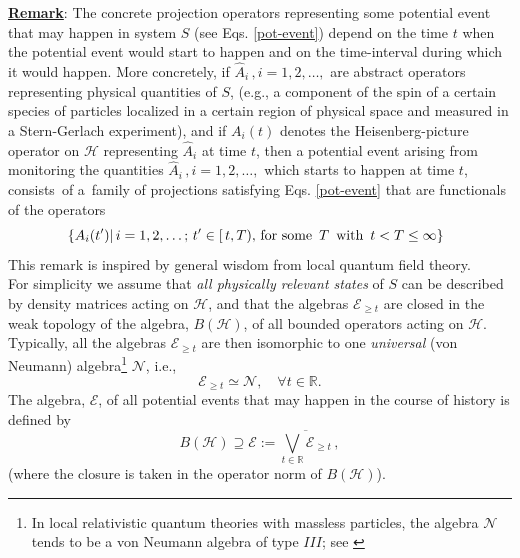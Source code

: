 \documentclass[a4paper,11pt]{article}
\begin{document}
\begin{enumerate}
{\underline{\bf{Remark}}: The concrete projection operators representing some potential event that may happen in system $S$ (see Eqs. \eqref{pot-event}) depend
on the time $t$ when the potential event would start to happen and on the time-interval during which it would happen. More concretely, if $\hat{A}_{i}\,, i=1,2, \dots,$ are abstract operators representing physical quantities of $S$, (e.g., a component of the spin of a certain species of particles localized in a certain region of physical space and measured in a Stern-Gerlach experiment), and if $A_{i}(t)$ denotes the Heisenberg-picture operator on $\mathcal{H}$ representing $\hat{A}_i$ at time $t$, then a potential event arising from monitoring the quantities 
$\hat{A}_i \,,i=1,2, \dots,$ which starts to happen at time $t$, consists \,of a \,family of projections
satisfying Eqs. \eqref{pot-event} that are functionals of the operators 
$$\hspace{0.5cm} \lbrace A_{i}(t') \vert\, i=1,2, \dots;\, t' \in [\,t, T),\,\text{for some }\,T\, \text{ with  }\, t<T \leq \infty \rbrace \hspace{0.7cm} \square$$
This remark is inspired by general wisdom from local quantum field theory.\\

For simplicity we assume that \textit{all physically relevant states} of $S$ can be described by density matrices acting on $\mathcal{H}$, and that the algebras $\mathcal{E}_{\geq t}$ are closed in the weak topology of the algebra, $B(\mathcal{H})$, of all bounded operators acting on $\mathcal{H}$. Typically, all the algebras $\mathcal{E}_{\geq t}$ are then isomorphic to one \textit{universal} (von Neumann) algebra\footnote{In local relativistic quantum theories with massless particles, the algebra $\mathcal{N}$ tends to be a von Neumann algebra of type $III$; see \cite{Buchholz}} $\mathcal{N}$, i.e., 
\begin{equation}\label{iso}
\mathcal{E}_{\geq t} \simeq \mathcal{N}, \quad \forall t \in \mathbb{R}.
\end{equation}
The algebra, $\mathcal{E}$, of all potential events that may happen in the course of history is defined by
\begin{equation}\label{allevents}
B(\mathcal{H}) \supseteq \mathcal{E}:= \overline{\bigvee_{t \in \mathbb{R}} \mathcal{E}_{\geq t}}\,,
\end{equation}
(where the closure is taken in the operator norm of $B(\mathcal{H})$).
}\\


\end{enumerate}
\end{document}
